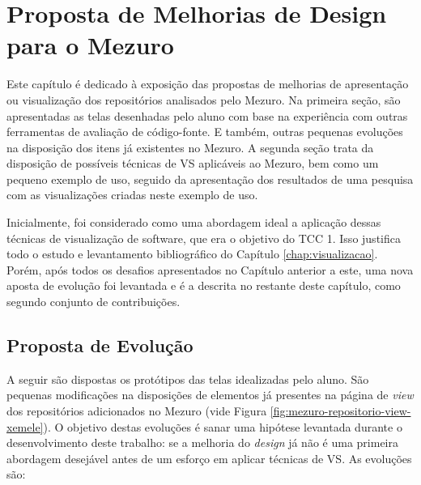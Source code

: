 \chapter{Proposta de Melhorias de Design para o Mezuro}
\label{chap:proposta}

Este capítulo é dedicado à exposição das propostas de melhorias de apresentação
ou visualização dos repositórios analisados pelo Mezuro. Na primeira seção, são
apresentadas as telas desenhadas pelo aluno com base na experiência com outras
ferramentas de avaliação de código-fonte. E também, outras pequenas evoluções
na disposição dos itens já existentes no Mezuro. A segunda seção trata da
disposição de possíveis técnicas de VS aplicáveis ao Mezuro, bem como um pequeno
exemplo de uso, seguido da apresentação dos resultados de uma pesquisa com as
visualizações criadas neste exemplo de uso.

Inicialmente, foi considerado como uma abordagem ideal a aplicação dessas
técnicas de visualização de software, que era o objetivo do TCC 1. Isso
justifica todo o estudo e levantamento bibliográfico do Capítulo
\ref{chap:visualizacao}. Porém, após todos os desafios apresentados no Capítulo
anterior a este, uma nova aposta de evolução foi levantada e é a descrita no
restante deste capítulo, como segundo conjunto de contribuições.

\section{Proposta de Evolução}

A seguir são dispostas os protótipos das telas idealizadas pelo aluno. São
pequenas modificações na disposições de elementos já presentes na página de
\textit{view} dos repositórios adicionados no Mezuro (vide Figura
\ref{fig:mezuro-repositorio-view-xemele}). O objetivo destas evoluções é sanar
uma hipótese levantada durante o desenvolvimento deste trabalho: se a melhoria do
\textit{design} já não é uma primeira abordagem desejável antes  de um esforço
em aplicar técnicas de VS. As evoluções são:

